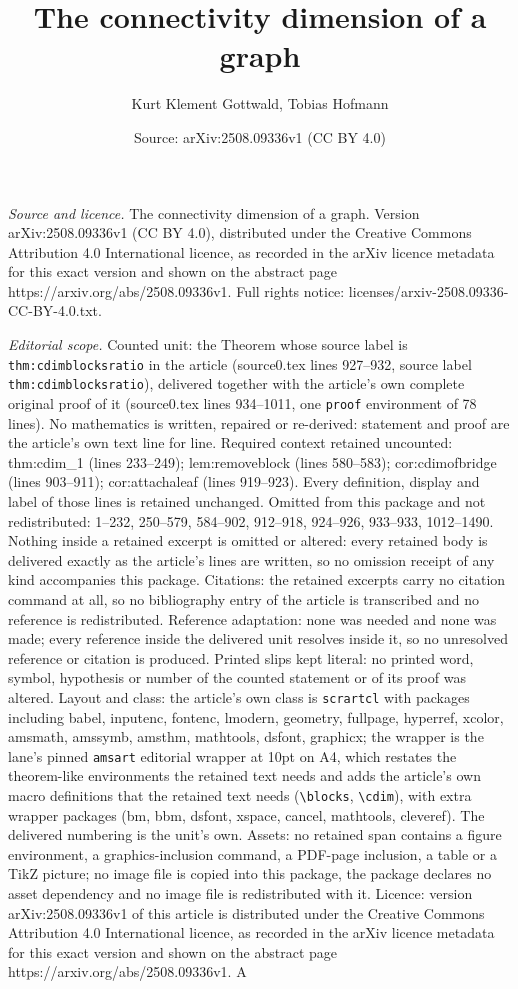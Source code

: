 \documentclass[10pt,a4paper]{amsart}
\title[The connectivity dimension of a graph]{The connectivity dimension of a graph}
\author{Kurt Klement Gottwald, Tobias Hofmann}
\date{Source: arXiv:2508.09336v1 (CC BY 4.0)}
\begin{document}
\maketitle

\noindent\emph{Source and licence.} The connectivity dimension of a graph. Version arXiv:2508.09336v1 (CC BY 4.0), distributed under the Creative Commons Attribution 4.0 International licence, as recorded in the arXiv licence metadata for this exact version and shown on the abstract page https://arxiv.org/abs/2508.09336v1. Full rights notice: licenses/arxiv-2508.09336-CC-BY-4.0.txt.\par\smallskip

\noindent\textit{Editorial scope.} Counted unit: the Theorem whose source label is \texttt{thm:cdimblocksratio} in the article (source0.tex lines 927--932, source label \texttt{thm:cdimblocksratio}), delivered together with the article's own complete original proof of it (source0.tex lines 934--1011, one \texttt{proof} environment of 78 lines). No mathematics is written, repaired or re-derived: statement and proof are the article's own text line for line. Required context retained uncounted: thm:cdim\_1 (lines 233--249); lem:removeblock (lines 580--583); cor:cdimofbridge (lines 903--911); cor:attachaleaf (lines 919--923). Every definition, display and label of those lines is retained unchanged. Omitted from this package and not redistributed: 1--232, 250--579, 584--902, 912--918, 924--926, 933--933, 1012--1490. Nothing inside a retained excerpt is omitted or altered: every retained body is delivered exactly as the article's lines are written, so no omission receipt of any kind accompanies this package. Citations: the retained excerpts carry no citation command at all, so no bibliography entry of the article is transcribed and no reference is redistributed. Reference adaptation: none was needed and none was made; every reference inside the delivered unit resolves inside it, so no unresolved reference or citation is produced. Printed slips kept literal: no printed word, symbol, hypothesis or number of the counted statement or of its proof was altered. Layout and class: the article's own class is \texttt{scrartcl} with packages including babel, inputenc, fontenc, lmodern, geometry, fullpage, hyperref, xcolor, amsmath, amssymb, amsthm, mathtools, dsfont, graphicx; the wrapper is the lane's pinned \texttt{amsart} editorial wrapper at 10pt on A4, which restates the theorem-like environments the retained text needs and adds the article's own macro definitions that the retained text needs (\texttt{\textbackslash blocks}, \texttt{\textbackslash cdim}), with extra wrapper packages (bm, bbm, dsfont, xspace, cancel, mathtools, cleveref). The delivered numbering is the unit's own. Assets: no retained span contains a figure environment, a graphics-inclusion command, a PDF-page inclusion, a table or a TikZ picture; no image file is copied into this package, the package declares no asset dependency and no image file is redistributed with it. Licence: version arXiv:2508.09336v1 of this article is distributed under the Creative Commons Attribution 4.0 International licence, as recorded in the arXiv licence metadata for this exact version and shown on the abstract page https://arxiv.org/abs/2508.09336v1. A 
\end{document}
